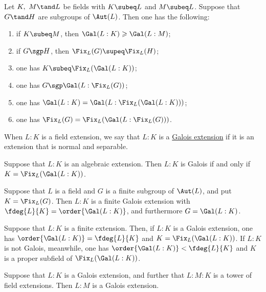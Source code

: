 \documentclass{article}
\begin{document}
  \begin{tproposition}
    Let \( K,\ M \tand L \) be fields with \( K\subeq L \) and \( M\subeq L \).
    Suppose that \( G\tand H \) are subgroups of \( \Aut(L) \).
    Then one has the following: \begin{enumerate}[label=(\alph*)]
      \item if \( K\subeq M \), then \( \Gal(L:K) \geqslant \Gal(L:M) \);
      \item if \( G\sgp H \), then \( \Fix_L(G)\supeq \Fix_L(H) \);
      \item one has \( K\subeq \Fix_L(\Gal(L:K)) \);
      \item one has \( G\sgp\Gal(L:\Fix_L(G)) \);
      \item one has \( \Gal(L:K) = \Gal(L:\Fix_L(\Gal(L:K))) \);
      \item one has \( \Fix_L(G) = \Fix_L(\Gal(L:\Fix_L(G))) \).
    \end{enumerate}
  \end{tproposition}

  \begin{tdefinition}
    When \( L:K \) is a field extension, we say that \( L:K \) is a \ul{Galois extension} if it is an extension that is normal and separable.
  \end{tdefinition}

  \begin{ttheorem}
    Suppose that \( L:K \) is an algebraic extension.
    Then \( L:K \) is Galois if and only if \( K=\Fix_L(\Gal(L:K)) \).
  \end{ttheorem}

  \begin{ttheorem}
    Suppose that \( L \) is a field and \( G \) is a finite subgroup of \( \Aut(L) \), and put \( K=\Fix_L(G) \).
    Then \( L:K \) is a finite Galois extension with \( \fdeg{L}{K}=\order{\Gal(L:K)} \), and furthermore \( G=\Gal(L:K) \).
  \end{ttheorem}

  \begin{ttheorem}
    Suppose that \( L:K \) is a finite extension.
    Then, if \( L:K \) is a Galois extension, one has \( \order{\Gal(L:K)}=\fdeg{L}{K} \) and \( K=\Fix_L(\Gal(L:K)) \).
    If \( L:K \) is not Galois, meanwhile, one has \( \order{\Gal(L:K)}<\fdeg{L}{K} \) and \( K \) is a proper subfield of \( \Fix_L(\Gal(L:K)) \).
  \end{ttheorem}

  \begin{tproposition}
    Suppose that \( L:K \) is a Galois extension, and further that \( L:M:K \) is a tower of field extensions.
    Then \( L:M \) is a Galois extension.
  \end{tproposition}
\end{document}
